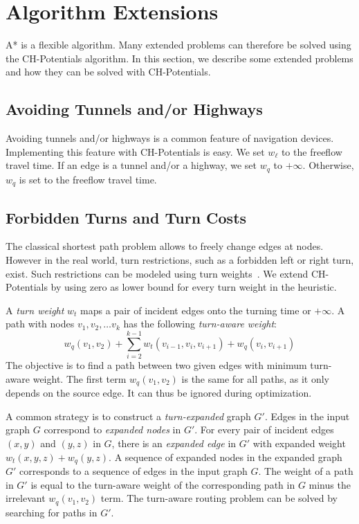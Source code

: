 \documentclass[a4paper,USenglish,cleveref, autoref, thm-restate]{lipics-v2019}
\begin{document}
\section{Algorithm Extensions}
\label{sec:extensions}

A* is a flexible algorithm.
Many extended problems can therefore be solved using the CH-Potentials algorithm.
In this section, we describe some extended problems and how they can be solved with CH-Potentials.

\subsection{Avoiding Tunnels and/or Highways}
\label{sec:no-tunnel-highway}

Avoiding tunnels and/or highways is a common feature of navigation devices.
Implementing this feature with CH-Potentials is easy.
We set $w_\ell$ to the freeflow travel time.
If an edge is a tunnel and/or a highway, we set $w_q$ to $+\infty$.
Otherwise, $w_q$ is set to the freeflow travel time.

\subsection{Forbidden Turns and Turn Costs}
\label{sec:no-turns}

The classical shortest path problem allows to freely change edges at nodes.
However in the real world, turn restrictions, such as a forbidden left or right turn, exist.
Such restrictions can be modeled using turn weights~\cite{gv-errnt-11,dgpw-crprn-13,bwzz-cchtc-20}.
We extend CH-Potentials by using zero as lower bound for every turn weight in the heuristic.

A \emph{turn weight} $w_t$  maps a pair of incident edges onto the turning time or $+\infty$.
A path with nodes $v_1, v_2,\ldots v_k$ has the following \emph{turn-aware weight}:\[
w_q(v_1, v_2) + \sum_{i=2}^{k-1}  w_t(v_{i-1},v_i,v_{i+1})  + w_q(v_i,v_{i+1})
\] The objective is to find a path between two given edges with minimum turn-aware weight.
The first term $w_q(v_1, v_2)$ is the same for all paths, as it only depends on the source edge.
It can thus be ignored during optimization.

A common strategy is to construct a \emph{turn-expanded} graph $G'$.
Edges in the input graph $G$ correspond to \emph{expanded nodes} in $G'$.
For every pair of incident edges $(x,y)$ and $(y,z)$ in $G$, there is an \emph{expanded edge} in $G'$ with expanded weight $w_t(x,y,z) + w_q(y,z)$.
A sequence of expanded nodes in the expanded graph $G'$ corresponds to a sequence of edges in the input graph $G$.
The weight of a path in $G'$ is equal to the turn-aware weight of the corresponding path in $G$ minus the irrelevant $w_q(v_1,v_2)$ term.
The turn-aware routing problem can be solved by searching for paths in $G'$.
\end{document}

